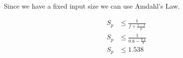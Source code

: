 \section{}
Since we have a fixed input size we can use Amdahl's Law.

\begin{equation*}
    \begin{split}
        S_p & \le \frac{1}{f + \frac{1-f}{p}} \\
        S_p & \le \frac{1}{0.6 - \frac{0.4}{8}} \\
        S_p & \le 1.538
    \end{split}
\end{equation*}
